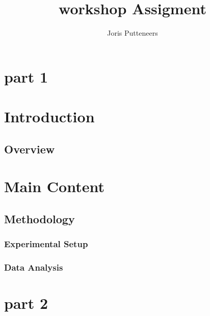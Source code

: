 

\title{\textbf{\huge workshop Assigment}}
\author{Joris Putteneers}
\date{}

\pagestyle{mypagestyle}




\maketitle

\chapter{part 1}


\chapter{Introduction}
\section{Overview}
\lipsum[1-10]
\chapter{Main Content}
\section{Methodology}
\subsection{Experimental Setup}
\subsection{Data Analysis}
\lipsum[11-20]

\lipsum[11-20]
\chapter{part 2}

\lipsum[1-10]




